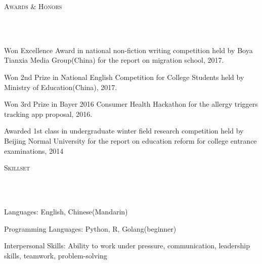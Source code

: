 \documentclass{article}
\newcommand{\header}[1]{{
\hspace*{-15pt}\vspace*{6pt} \textsc{#1}} \vspace*{-6pt} 
\lineunder
}
\newcommand{\lineunder}{
\vspace*{-8pt} \\ \hspace*{-18pt} 
\hrulefill \\
}
\renewcommand{\labelitemii}{
$\vcenter{\hbox{\tiny$\bullet$}}$\hspace*{-3pt}
}
\newenvironment{bullet-list-major}{
\begin{list}{\labelitemii}{\setlength\leftmargin{3pt} 
\topsep 0pt \itemsep -2pt}}{\vspace*{4pt}\end{list}
}
\begin{document}
\vspace*{4pt}%
\header{Awards \& Honors}
    \begin{bullet-list-major}
    \item Won Excellence Award in national non-fiction writing competition held by Boya Tianxia Media Group(China) for the report on migration school, 2017.
    \vspace{2pt}
    \item Won 2nd Prize in National English Competition for College Students held by Ministry of Education(China), 2017.
    \vspace{2pt}
    \item Won 3rd Prize in Bayer 2016 Consumer Health Hackathon for the allergy triggers tracking app proposal, 2016.
    \vspace{2pt}
    \item Awarded 1st class in undergraduate winter field research competition held by Beijing Normal University for the report on education reform for college entrance examinations, 2014
    \vspace{2pt}
    \end{bullet-list-major}
    
    
\vspace*{4pt}%
\header{Skillset}
    \begin{bullet-list-major}
    \item Languages: English, Chinese(Mandarin)
    \vspace{2pt}
    \item Programming Languages: Python, R, Golang(beginner)
    \vspace{2pt}
    \item Interpersonal Skills: Ability to work under pressure, communication, leadership skills, teamwork, problem-solving
    \end{bullet-list-major}
\end{document}
